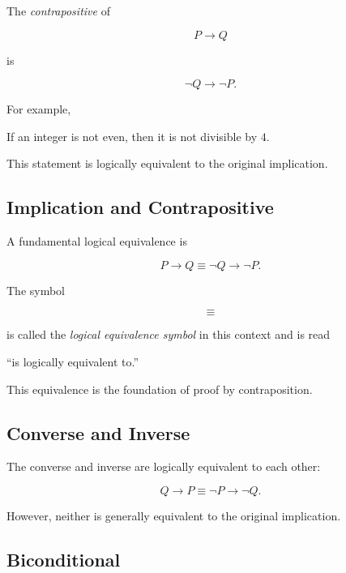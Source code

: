 The \emph{contrapositive} of

\[ P\to Q \]

is

\[ \neg Q\to\neg P. \]

For example,

\begin{center}
If an integer is not even, then it is not divisible by \(4\).
\end{center}

This statement is logically equivalent to the original implication.

\subsection{Implication and Contrapositive}
\label{subsec:implication-contrapositive-equivalence}

A fundamental logical equivalence is

\[ P\to Q\equiv\neg Q\to\neg P. \]

The symbol

\[ \equiv \]

is called the \emph{logical equivalence symbol} in this context and is read

\begin{center}
``is logically equivalent to.''
\end{center}

This equivalence is the foundation of proof by contraposition.

\subsection{Converse and Inverse}
\label{subsec:converse-inverse-equivalence}

The converse and inverse are logically equivalent to each other:

\[ Q\to P\equiv\neg P\to\neg Q. \]

However, neither is generally equivalent to the original implication.

\subsection{Biconditional}
\label{subsec:biconditional}

